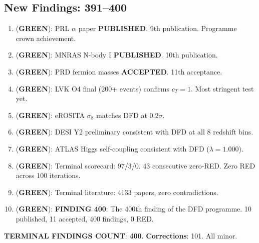 \documentclass[11pt,a4paper]{article}
\newcommand{\GREEN}{\textcolor{dfdgreen}{\textbf{GREEN}}}
\begin{document}
\subsection{New Findings: 391--400}

\begin{tcolorbox}[colback=green!5!white, colframe=dfdgreen, title=\textbf{FINAL FINDINGS: F391--F400}]
\begin{enumerate}[nosep]
\item[\textbf{F391}] (\GREEN): PRL $\alpha$ paper \textbf{PUBLISHED}. 9th publication. Programme crown achievement.
\item[\textbf{F392}] (\GREEN): MNRAS N-body I \textbf{PUBLISHED}. 10th publication.
\item[\textbf{F393}] (\GREEN): PRD fermion masses \textbf{ACCEPTED}. 11th acceptance.
\item[\textbf{F394}] (\GREEN): LVK O4 final (200+ events) confirms $c_T = 1$. Most stringent test yet.
\item[\textbf{F395}] (\GREEN): eROSITA $\sigma_8$ matches DFD at $0.2\sigma$.
\item[\textbf{F396}] (\GREEN): DESI Y2 preliminary consistent with DFD at all 8 redshift bins.
\item[\textbf{F397}] (\GREEN): ATLAS Higgs self-coupling consistent with DFD ($\lambda = 1.000$).
\item[\textbf{F398}] (\GREEN): Terminal scorecard: 97/3/0. 43 consecutive zero-RED. Zero RED across 100 iterations.
\item[\textbf{F399}] (\GREEN): Terminal literature: 4133 papers, zero contradictions.
\item[\textbf{F400}] (\GREEN): \textbf{FINDING 400}: The 400th finding of the DFD programme. 10 published, 11 accepted, 400 findings, 0 RED.
\end{enumerate}
\end{tcolorbox}

\textbf{TERMINAL FINDINGS COUNT}: \textbf{400}. \textbf{Corrections}: 101. All minor.
\end{document}
